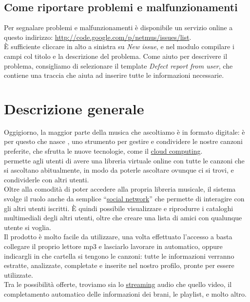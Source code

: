 \section{Come riportare problemi e malfunzionamenti}
Per segnalare problemi e malfunzionamenti \`e disponibile un servizio online a
questo indirizzo: \url{http://code.google.com/p/netmus/issues/list}.\\
\`E sufficiente cliccare in alto a sinistra su \emph{New issue}, e nel modulo
compilare i campi col titolo e la descrizione del problema.
Come aiuto per descrivere il problema, consigliamo di selezionare il template
\emph{Defect report from user}, che contiene una traccia che aiuta ad inserire
tutte le informazioni necessarie.

\chapter{Descrizione generale}
\thispagestyle{fancy}
Oggigiorno, la maggior parte della musica che ascoltiamo \`e in formato digitale: \`e
per questo che nasce , uno strumento per gestire e condividere le
nostre canzoni preferite, che sfrutta le nuove tecnologie, come il
\underline{cloud computing}.\\

 permette agli utenti di avere una
libreria virtuale online con tutte le canzoni che si ascoltano abitualmente, in modo da
poterle ascoltare ovunque ci si trovi, e condividerle con altri utenti.\\

Oltre alla comodit\`a di poter accedere alla propria libreria musicale, il
sistema  svolge il ruolo anche da semplice ``\underline{social
network}'' che permette di interagire con gli altri utenti iscritti. \`E quindi
possibile visualizzare e riprodurre i cataloghi multimediali degli altri utenti, oltre che
creare una lista di amici con qualunque utente si voglia.\\

Il prodotto \`e molto facile da utilizzare, una volta effettuato l'accesso
a  basta collegare il proprio lettore mp3 e lasciarlo lavorare in
automatico, oppure indicargli in che cartella si tengono le canzoni: tutte le 
informazioni verranno estratte, analizzate, completate e
inserite nel nostro profilo, pronte per essere utilizzate.\\

Tra le possibilit\`a offerte, troviamo sia lo \underline{streaming} audio che
quello video, il completamento automatico delle informazioni dei brani, le playlist, e
molto altro.\\

